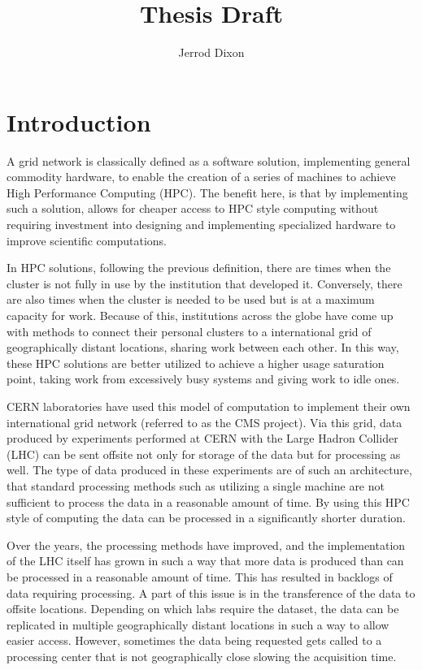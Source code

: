 \documentclass[]{scrartcl}
\title{Thesis Draft}
\author{Jerrod Dixon}
\begin{document}
\maketitle

\section{Introduction}
A grid network is classically defined as a software solution, implementing general commodity hardware, to enable the creation of a series of machines to achieve High Performance Computing (HPC). The benefit here, is that by implementing such a solution, allows for cheaper access to HPC style computing without requiring investment into designing and implementing specialized hardware to improve scientific computations.

In HPC solutions, following the previous definition, there are times when the cluster is not fully in use by the institution that developed it. Conversely, there are also times when the cluster is needed to be used but is at a maximum capacity for work. Because of this, institutions across the globe have come up with methods to connect their personal clusters to a international grid of geographically distant locations, sharing work between each other. In this way, these HPC solutions are better utilized to achieve a higher usage saturation point, taking work from excessively busy systems and giving work to idle ones.

CERN laboratories have used this model of computation to implement their own international grid network (referred to as the CMS project). Via this grid, data produced by experiments performed at CERN with the Large Hadron Collider (LHC) can be sent offsite not only for storage of the data but for processing as well. The type of data produced in these experiments are of such an architecture, that standard processing methods such as utilizing a single machine are not sufficient to process the data in a reasonable amount of time. By using this HPC style of computing the data can be processed in a significantly shorter duration.

Over the years, the processing methods have improved, and the implementation of the LHC itself has grown in such a way that more data is produced than can be processed in a reasonable amount of time. This has resulted in backlogs of data requiring processing. A part of this issue is in the transference of the data to offsite locations. Depending on which labs require the dataset, the data can be replicated in multiple geographically distant locations in such a way to allow easier access. However, sometimes the data being requested gets called to a processing center that is not geographically close slowing the acquisition time.  
\end{document}
